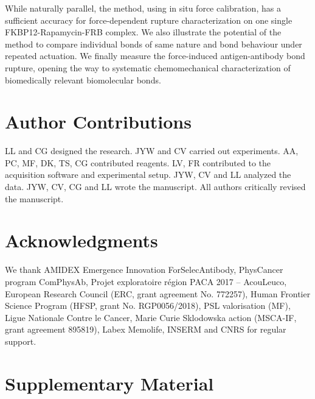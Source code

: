 \documentclass{biophys-new}
\begin{document}
While naturally parallel, the method, using in situ force calibration, has a sufficient accuracy for force-dependent rupture characterization on one single FKBP12-Rapamycin-FRB complex. We also illustrate the potential of the method to compare individual bonds of same nature and bond behaviour under repeated actuation. We finally measure the force-induced antigen-antibody bond rupture, opening the way to systematic chemomechanical characterization of biomedically relevant biomolecular bonds.


%
%
%
%



\section*{Author Contributions}

LL and CG designed the research. JYW and CV carried out experiments. AA, PC, MF, DK, TS, CG contributed reagents. LV, FR contributed to the acquisition software and experimental setup. JYW, CV and LL analyzed the data. JYW, CV, CG and LL wrote the manuscript. All authors critically revised the manuscript.

\section*{Acknowledgments}

We thank AMIDEX Emergence Innovation ForSelecAntibody, PhysCancer program ComPhysAb, Projet exploratoire région PACA 2017 – AcouLeuco, European Research Council (ERC, grant agreement No. 772257), Human Frontier Science Program (HFSP, grant No. RGP0056/2018), PSL valorisation (MF), Ligue Nationale Contre le Cancer,  Marie Curie Sklodowska action (MSCA-IF, grant agreement 895819), Labex Memolife, INSERM and CNRS for regular support.





\newpage

\FloatBarrier

\newpage

\section*{Supplementary Material}
\end{document}
